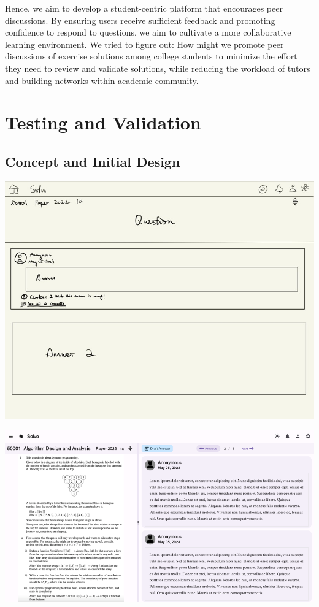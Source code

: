 \documentclass[a4paper]{article}
\begin{document}
    Hence, we aim to develop a student-centric platform that encourages peer discussions.
    By ensuring users receive sufficient feedback and promoting confidence to respond to questions, we aim to cultivate a more collaborative learning environment.
    We tried to figure out: How might we promote peer discussions of exercise solutions among college students to minimize the effort they need to review and validate solutions,
    while reducing the workload of tutors and building networks within academic community.

    \section*{Testing and Validation}

    \subsection*{Concept and Initial Design}
    \begin{minipage}{0.4\textwidth}
        \centering
        \includegraphics[width=\textwidth]{concept2}
    \end{minipage}\hspace{0.05\textwidth}
    \begin{minipage}{0.57\textwidth}
        \centering
        \includegraphics[width=\textwidth]{question-page2}
    \end{minipage}
\end{document}
